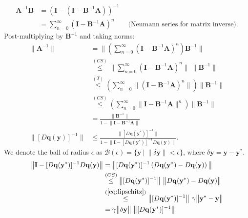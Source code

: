 \begin{equation}
\begin{split}
    \mathbf{A}^{-1}\mathbf{B} & = \left(\mathbf{I} - \left(\mathbf{I} - \mathbf{B}^{-1}\mathbf{A}\right)\right)^{-1} \\
    & = \sum_{n=0}^{\infty}\left(\mathbf{I} - \mathbf{B}^{-1}\mathbf{A}\right)^n \qquad \textrm{(Neumann series for matrix inverse)}.
\end{split}
\end{equation}
Post-multiplying by $\mathbf{B}^{-1}$ and taking norms:
\begin{equation}
\begin{split}
    \big \| \mathbf{A}^{-1} \big \| & = \Bigg \| \left(\sum_{n=0}^{\infty}\left(\mathbf{I} - \mathbf{B}^{-1}\mathbf{A}\right)^n\right)\mathbf{B}^{-1} \Bigg \| \\
    & \overset{(CS)}{\le} \Bigg \| \sum_{n=0}^{\infty}\left(\mathbf{I} - \mathbf{B}^{-1}\mathbf{A}\right)^n \Bigg \| \ \big \| \mathbf{B}^{-1} \big \| \\
    & \overset{(T)}{\le} \left(\sum_{n=0}^{\infty}\Big \| \left(\mathbf{I} - \mathbf{B}^{-1}\mathbf{A}\right)^n \Big \|\right) \big \| \mathbf{B}^{-1} \big \| \\
    & \overset{(CS)}{\le} \left(\sum_{n=0}^{\infty}\big \| \mathbf{I} - \mathbf{B}^{-1}\mathbf{A} \big \|^n\right) \big \| \mathbf{B}^{-1} \big \|  \\
    & = \frac{\big \|\mathbf{B}^{-1}\big \|}{1-\big \|\mathbf{I} - \mathbf{B}^{-1}\mathbf{A}\big \|} \\ 
    \big \| [D\mathbf{q}(\mathbf{y})]^{-1} \big \| & \le \frac{\big \|[D\mathbf{q}(\mathbf{y}^*)]^{-1}\big \|}{1-\big \|\mathbf{I} - [D\mathbf{q}(\mathbf{y}^*)]^{-1}D\mathbf{q}(\mathbf{y})\big \|}.
\end{split}
\end{equation}
We denote the ball of radius $\epsilon$ as $\mathcal{B}(\epsilon) = \{\mathbf{y} \ | \ \|\delta \mathbf{y}\| < \epsilon \}$, where $\delta \mathbf{y}=\mathbf{y}-\mathbf{y}^*$. 
\begin{equation}
\begin{split}
    \big \|\mathbf{I} - [D\mathbf{q}(\mathbf{y}^*)]^{-1}D\mathbf{q}(\mathbf{y})\big \| & = \big \|[D\mathbf{q}(\mathbf{y}^*)]^{-1}\left(D\mathbf{q}(\mathbf{y}^*) - D\mathbf{q}(\mathbf{y})\right)\big \| \\
    & \overset{(CS)}{\le} \big \|[D\mathbf{q}(\mathbf{y}^*)]^{-1}\big \| \ \big \|D\mathbf{q}(\mathbf{y}^*) - D\mathbf{q}(\mathbf{y})\big \| \\
    & \overset{(\ref{eq:lipschitz})}{\le}  \big \|[D\mathbf{q}(\mathbf{y}^*)]^{-1}\big \| \ \gamma  \big \|\mathbf{y}^* - \mathbf{y}\big \| \\
    & =  \gamma\big \|\delta\mathbf{y}\big \| \ \big \|[D\mathbf{q}(\mathbf{y}^*)]^{-1}\big \|    
\end{split}
\end{equation}
